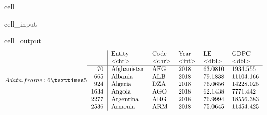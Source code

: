\documentclass[letterpaper,10pt,english]{jupyterBook}
\begin{document}
\begin{sphinxuseclass}{cell}\begin{sphinxVerbatimInput}

\begin{sphinxuseclass}{cell_input}
\begin{sphinxVerbatim}[commandchars=\\\{\}]
\end{sphinxVerbatim}

\end{sphinxuseclass}\end{sphinxVerbatimInput}
\begin{sphinxVerbatimOutput}

\begin{sphinxuseclass}{cell_output}\begin{equation*}
\begin{split}A data.frame: 6 × 5
\begin{tabular}{r|lllll}
  & Entity & Code & Year & LE & GDPC\\
  & <chr> & <chr> & <int> & <dbl> & <dbl>\\
\hline
	70 & Afghanistan & AFG & 2018 & 63.0810 &  1934.555\\
	665 & Albania     & ALB & 2018 & 79.1838 & 11104.166\\
	924 & Algeria     & DZA & 2018 & 76.0656 & 14228.025\\
	1634 & Angola      & AGO & 2018 & 62.1438 &  7771.442\\
	2277 & Argentina   & ARG & 2018 & 76.9994 & 18556.383\\
	2536 & Armenia     & ARM & 2018 & 75.0645 & 11454.425\\
\end{tabular}\end{split}
\end{equation*}
\end{sphinxuseclass}\end{sphinxVerbatimOutput}

\end{sphinxuseclass}
\end{document}
